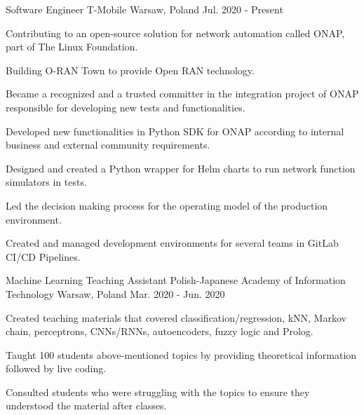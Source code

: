

\begin{cventries}

  \cventry
    {Software Engineer} %
    {T-Mobile} %
    {Warsaw, Poland} %
    {Jul. 2020 - Present} %
    {
      \begin{cvitems} %
        \item {Contributing to an open-source solution for network automation called ONAP, part of The Linux Foundation.}
        \item {Building O-RAN Town to provide Open RAN technology.}
        \item {Became a recognized and a trusted committer in the integration project of ONAP responsible for developing new tests and functionalities.}
        \item {Developed new functionalities in Python SDK for ONAP according to internal business and external community requirements.}
        \item {Designed and created a Python wrapper for Helm charts to run network function simulators in tests.}
        \item {Led the decision making process for the operating model of the production environment.}
        \item {Created and managed development environments for several teams in GitLab CI/CD Pipelines.}
      \end{cvitems}
    }
    
\cventry
    {Machine Learning Teaching Assistant} %
    {Polish-Japanese Academy of Information Technology} %
    {Warsaw, Poland} %
    {Mar. 2020 - Jun. 2020} %
    {
      \begin{cvitems} %
        \item {Created teaching materials that covered classification/regression, kNN, Markov chain, perceptrons, CNNs/RNNs, autoencoders, fuzzy logic and Prolog.}
        \item {Taught 100 students above-mentioned topics by providing theoretical information followed by live coding.}
        \item {Consulted students who were struggling with the topics to ensure they understood the material after classes.}
      \end{cvitems}
    }
    

\end{cventries}
